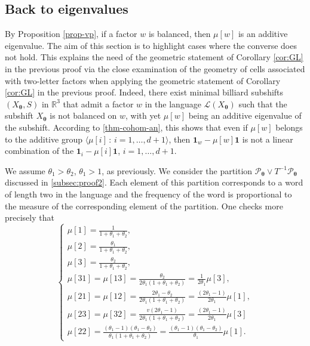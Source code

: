 \documentclass{article}
\theoremstyle{definition}
\newcommand{\btheta}{\boldsymbol{\theta}}
\begin{document}
\subsection{Back to  eigenvalues}\label{subsec:back}


 By Proposition \ref{prop-vp},  if a factor  $w$ is balanced, then $\mu[w]$ is an additive  eigenvalue.
 The aim of this section is to highlight cases where   the converse  does not hold. This explains  the need   of the  geometric statement of 
 Corollary  \ref{cor:GL} in the previous proof via the   close examination of the geometry
 of cells associated with two-letter factors  when applying 
 the geometric statement of 
 Corollary  \ref{cor:GL} in the previous proof.  Indeed, 
there exist   minimal  billiard subshifts $(X_{\btheta},S)$  in $\mathbb R^3$  that admit a   factor  $w$ in the language  ${\mathcal L}(X_{\btheta})$ such that the
subshift  $X_{\btheta}$ is not  balanced on  $w$, with
yet  $\mu[w]$  being an  additive eigenvalue of the subshift. According to \cref{thm-cohom-an},  this shows that even  if
$\mu[w]$ belongs to  the   additive group $\langle \mu[i] \,:\, i=1, \ldots, d+1\rangle$,
then  ${\mathbf 1}_w - \mu[w] {\mathbf 1}$  is not a linear combination of  the
 ${\mathbf 1}_i - \mu[i] {\mathbf 1}$, $i=1, \ldots, d+1$.





We assume   $\theta_1>\theta_2$, $\theta_1>1$, as previously.
We  consider the partition  $\mathcal P_{\btheta} \vee T^{-1}\mathcal P_{\btheta} $ discussed in \cref{subsec:proof2}. Each element of this partition corresponds to a word of length two in the language and  the frequency of the word is proportional to the measure  of the  corresponding element of the partition. One checks  more precisely that
$$
\begin{cases}
\mu[1]=\frac{1}{1+\theta_1+\theta_2},\\
\mu[2]=\frac{\theta_1}{1+\theta_1+\theta_2},\\
\mu[3]=\frac{\theta_2}{1+\theta_1+\theta_2},\\
\mu[31]=\mu[13]= \frac{\theta_2}{2\theta_1(1+\theta_1+\theta_2)}=\frac{1}{2\theta_1}\mu[3], \\
\mu [21]= \mu[12]= \frac{2\theta_1-\theta_2}{2\theta_1(1+\theta_1+\theta_2)}= \frac{(2\theta_1-1)}{2\theta_1}\mu[1],\\
\mu[23]=\mu[32]=\frac{v(2\theta_1-1)}{2\theta_1(1+\theta_1+\theta_2)}= \frac{(2\theta_1-1)}{2\theta_1}\mu[3]\\
 \mu[22]%
 =\frac{ (\theta_1-1)(\theta_1-\theta_2)}{\theta_1(1+\theta_1+\theta_2)} 
 =\frac{(\theta_1-1)(\theta_1-\theta_2)}{\theta_1}\mu[1].
 \end{cases}
$$
\end{document}
